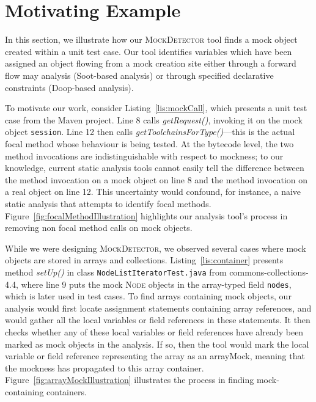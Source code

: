\section{Motivating Example}
\label{sec:motivating-example}

In this section, we illustrate how our \textsc{MockDetector} tool finds a mock object created within a unit test case. Our tool identifies variables which have been assigned an object flowing from a mock creation site either through a forward flow may analysis (Soot-based analysis) or through specified declarative constraints (Doop-based analysis).


To motivate our work, consider Listing~\ref{lis:mockCall}, which presents a unit test case from the Maven project. Line 8 calls \textit{getRequest()}, invoking it on the mock object \texttt{session}. Line 12 then calls \textit{getToolchainsForType()}---this is the actual focal method whose behaviour is being tested. At the bytecode level, the two method invocations are indistinguishable with respect to mockness; to our knowledge, current static analysis tools cannot easily tell the difference between the method invocation on a mock object on line 8 and the method invocation on a real object on line 12. This uncertainty would confound, for instance, a naive static analysis that attempts to identify focal methods. Figure~\ref{fig:focalMethodIllustration} highlights our analysis tool's process in removing non focal method calls on mock objects.

While we were designing \textsc{MockDetector}, we observed several cases where mock objects are stored in arrays and collections. Listing~\ref{lis:container} presents method \textit{setUp()} in class \texttt{NodeListIteratorTest.java} from commons-collections-4.4, where line 9 puts the mock \textsc{Node} objects in the array-typed field \texttt{nodes}, which is later used in test cases. To find arrays containing mock objects, our analysis would first locate assignment statements containing array references, and would gather all the local variables or field references in these statements. It then checks whether any of these local variables or field references have already been marked as mock objects in the analysis. If so, then the tool would mark the local variable or field reference representing the array as an arrayMock, meaning that the mockness has propagated to this array container. Figure~\ref{fig:arrayMockIllustration} illustrates the process in finding mock-containing containers.

